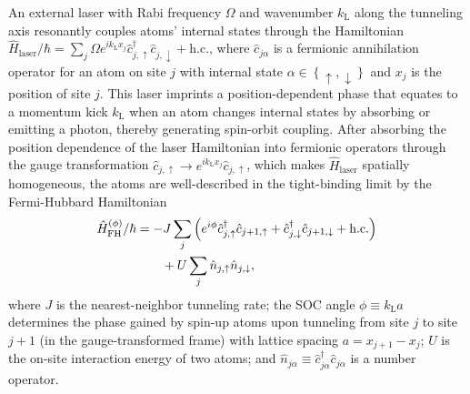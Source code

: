 \documentclass[aps,prx,superscriptaddress,notitlepage,twocolumn,longbibliography]{revtex4-2}
\renewcommand{\t}{\text} %
\newcommand{\p}[1]{\left(#1\right)} %
\renewcommand{\set}[1]{\left\{#1\right\}} %
\newcommand{\up}{\uparrow}
\newcommand{\dn}{\downarrow}
\begin{document}
An external laser with Rabi frequency $\Omega$ and wavenumber $k_{\t{L}}$ along the tunneling axis resonantly couples atoms' internal states through the Hamiltonian $\hat H_{\t{laser}}/\hbar = \sum_j \Omega e^{ik_{\t{L}}x_j} \hat c_{j,\up}^\dag \hat c_{j,\dn} + \t{h.c.}$, where $\hat c_{j\alpha}$ is a fermionic annihilation operator for an atom on site $j$ with internal state $\alpha\in\set{\up,\dn}$ and $x_j$ is the position of site $j$.
This laser imprints a position-dependent phase that equates to a momentum kick $k_{\t{L}}$ when an atom changes internal states by absorbing or emitting a photon, thereby generating spin-orbit coupling\cite{wall2016synthetic, livi2016synthetic}.
After absorbing the position dependence of the laser Hamiltonian into fermionic operators through the gauge transformation $\hat c_{j,\up}\to e^{ik_{\t{L}} x_j}\hat c_{j,\up}$, which makes $\hat H_{\t{laser}}$ spatially homogeneous, the atoms are well-described in the tight-binding limit by the Fermi-Hubbard Hamiltonian\cite{esslinger2010fermihubbard}
\begin{align}
  \hat H_{\t{FH}}^{(\phi)}/\hbar
  &= -J \sum_j \p{e^{i\phi} \hat c_{j,\up}^\dag \hat c_{j+1,\up}
  + \hat c_{j,\dn}^\dag \hat c_{j+1,\dn} + \text{h.c.}} \notag \\
  &\qquad + U \sum_j \hat n_{j,\up} \hat n_{j,\dn},
\end{align}
where $J$ is the nearest-neighbor tunneling rate; the SOC angle $\phi\equiv k_{\t{L}}a$ determines the phase gained by spin-up atoms upon tunneling from site $j$ to site $j+1$ (in the gauge-transformed frame) with lattice spacing $a=x_{j+1}-x_j$; $U$ is the on-site interaction energy of two atoms; and $\hat n_{j\alpha}\equiv\hat c_{j\alpha}^\dag \hat c_{j\alpha}$ is a number operator.
\end{document}
